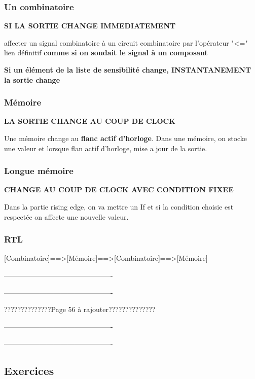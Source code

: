 \subsubsection{Un combinatoire}
\textbf{SI LA SORTIE CHANGE IMMEDIATEMENT}

affecter un signal combinatoire à un circuit combinatoire par l'opérateur "<=" lien définitif \textbf{comme si on soudait le signal à un composant}

\textbf{Si un élément de la liste de sensibilité change, INSTANTANEMENT la sortie change}

\subsubsection{Mémoire}
\textbf{LA SORTIE CHANGE AU COUP DE CLOCK}

Une mémoire change au \textbf{flanc actif d'horloge}. Dans une mémoire, on stocke une valeur et lorsque flan actif d'horloge, mise a jour de la sortie.

\subsubsection{Longue mémoire}
\textbf{CHANGE AU COUP DE CLOCK AVEC CONDITION FIXEE}

Dans la partie rising edge, on va mettre un If et si la condition choisie est respectée on affecte une nouvelle valeur.

\subsubsection{RTL}

[Combinatoire]==>[Mémoire]==>[Combinatoire]==>[Mémoire]






----------------------------------------------

----------------------------------------------

??????????????Page 56 à rajouter??????????????


----------------------------------------------

----------------------------------------------

\subsection{Exercices}





